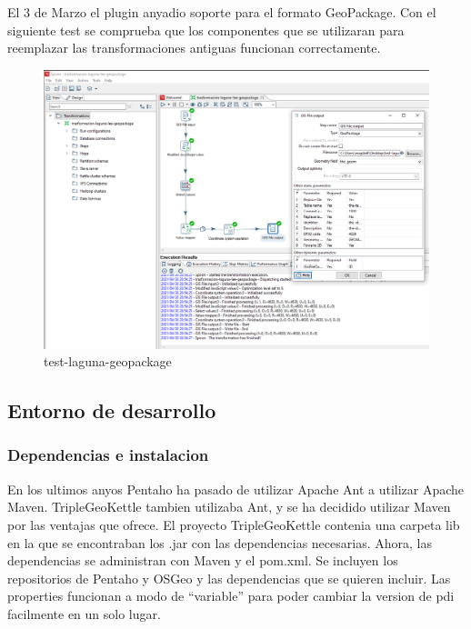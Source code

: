 El 3 de Marzo el plugin anyadio soporte para el formato GeoPackage. Con el siguiente test se comprueba que los
componentes que se utilizaran para reemplazar las transformaciones antiguas funcionan correctamente.

\begin{figure}[H]
    \includegraphics[width=\textwidth]{images/test-laguna-geopackage.png}
    \centering
    \caption{test-laguna-geopackage}
    \label{fig:test-laguna-geopackage}
\end{figure}

\subsection{Entorno de desarrollo}

\subsubsection{Dependencias e instalacion}

En los ultimos anyos Pentaho ha pasado de utilizar Apache Ant a utilizar Apache Maven. TripleGeoKettle tambien
utilizaba Ant, y se ha decidido utilizar Maven por las ventajas que ofrece. El proyecto TripleGeoKettle contenia
una carpeta lib en la que se encontraban los .jar con las dependencias necesarias. Ahora, las dependencias se
administran con Maven y el pom.xml. Se incluyen los repositorios de Pentaho y OSGeo y las dependencias que se
quieren incluir. Las properties funcionan a modo de ``variable'' para poder cambiar la version de pdi facilmente
en un solo lugar.




